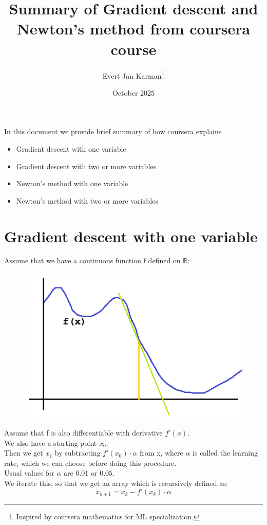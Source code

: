 \documentclass[12pt, letterpaper]{article}
\title{Summary of Gradient descent and Newton's method from coursera course}
\author{Evert Jan Karman\thanks{Inspired by coursera mathematics for ML specialization.}}
\date{October 2025}
\begin{document}
\maketitle

In this document we provide brief summary of how coursera explains
\begin{itemize}
    \item Gradient descent with one variable
    \item Gradient descent with two or more variables
    \item Newton's method with one variable
    \item Newton's method with two or more variables
\end{itemize}

\section{Gradient descent with one variable}

Assume that we have a continuous function f defined on $\mathbb{R}$:

\begin{figure}[H]
    \includegraphics{fx_example_01.png}
\end{figure}
Assume that f is also differentiable with derivative $f'(x)$.\\
We also have a starting point $x_0$.\\
Then we get $x_1$ by subtracting $f'(x_0) \cdot \alpha$ from x, where $\alpha$ is called the learning rate, which we can choose before doing this procedure.\\
Usual values for $\alpha$ are $0.01$ or $0.05$.\\
We iterate this, so that we get an array which is recursively defined as:\\
\[x_{k+1} = x_k - f'(x_k) \cdot \alpha\]
\end{document}
